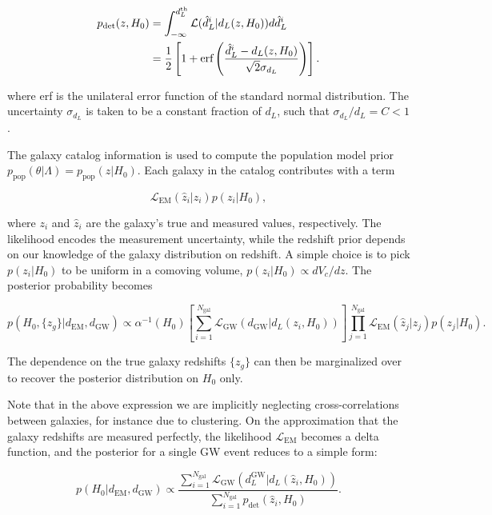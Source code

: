 \documentclass[%
preprint,
nofootinbib,
 amsmath,amssymb,
 aps,
]{revtex4-2}
\newcommand{\given}[2]{p( #1 | #2 )}
\newcommand{\ppop}[0]{p_{\text{pop}}}
\newcommand{\pdet}[0]{p_{\text{det}}}
\begin{document}
\begin{align}
	\nonumber
	\pdet(z, H_0) & = \int_{-\infty}^{d_L^{\rm{th}}} \mathcal{L}(\hat{d}_L^i | d_L(z, H_0)) d \hat{d}_L^i                                    \\
	              & = \frac{1}{2} \left [ 1 + \text{erf} \left (\frac{\hat{d}_L^i - d_L(z, H_0)}{ \sqrt{2} \sigma_{d_L}}  \right ) \right ].
\end{align}

where erf is the unilateral error function of the standard normal distribution. The uncertainty
$\sigma_{d_L}$ is taken to be a constant fraction of $d_L$, such that $\sigma_{d_L} / d_L = C < 1$.

The galaxy catalog information is used to compute the population model prior $\ppop(\theta |
	\Lambda) = \ppop(z | H_0)$. Each galaxy in the catalog contributes with a term

\begin{equation}
	\mathcal{L}_\text{EM}(\hat{z}_i | z_i)p(z_i | H_0),
\end{equation}

where $z_i$ and $\hat{z}_i$ are the galaxy's true and measured values, respectively. The likelihood
encodes the measurement uncertainty, while the redshift prior depends on our knowledge of the
galaxy distribution on redshift. A simple choice is to pick $p(z_i | H_0)$ to be uniform in a
comoving volume, $p(z_i | H_0) \propto dV_c /dz$. The posterior probability becomes

\begin{equation}
	\label{eq:stat:full-redshift-posterior}
	\given{H_0, \{z_g\}}{d_\text{EM}, d_\text{GW}} \propto
	\alpha^{-1}(H_0) \left [ \sum_{i=1}^{N_\text{gal}} \mathcal{L}_\text{GW}(d_\text{GW} | d_L(z_i, H_0)) \right ]
	\prod_{j=1}^{N_\text{gal}} \mathcal{L}_\text{EM}(\hat{z}_j | z_j)p(z_j | H_0).
\end{equation}

The dependence on the true galaxy redshifts $\{z_g\}$ can then be marginalized over to recover the
posterior distribution on $H_0$ only.

Note that in the above expression we are implicitly neglecting cross-correlations between galaxies,
for instance due to clustering. On the approximation that the galaxy redshifts are measured
perfectly, the likelihood $\mathcal{L}_\text{EM}$ becomes a delta function, and the posterior for a
single GW event reduces to a simple form:

\begin{equation}
	\label{eq:stat:perfect-redshift-posterior}
	\given{H_0}{d_\text{EM}, d_\text{GW}} \propto
	\frac{\sum_{i=1}^{N_\text{gal}} \mathcal{L}_\text{GW}(d^\text{GW}_L | d_L(\hat{z}_i, H_0))}{\sum_{i=1}^{N_\text{gal}} \pdet(\hat{z}_i, H_0)}.
\end{equation}
\end{document}

